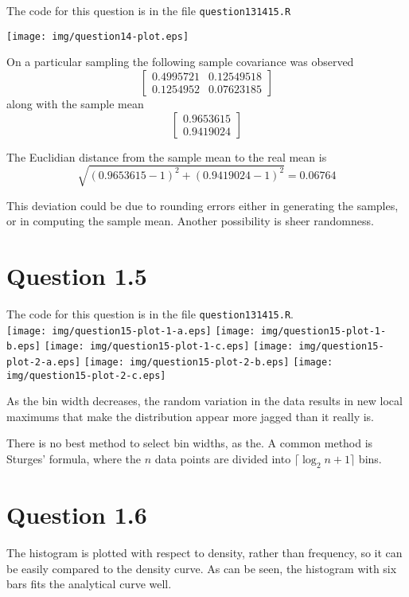 \documentclass[a4paper, oneside, final]{memoir}
\begin{document}
The code for this question is in the file \texttt{question131415.R}

\texttt{[image: img/question14-plot.eps]}

On a particular sampling the following sample covariance was observed
\[
\left[\begin{matrix}0.4995721&0.12549518\\0.1254952&0.07623185\end{matrix}\right]
\]
along with the sample mean
\[
\left[\begin{matrix}0.9653615\\0.9419024\end{matrix}\right]
\]

The Euclidian distance from the sample mean to the real mean is
\[
\sqrt{(0.9653615-1)^2+(0.9419024-1)^2}=0.06764
\]

This deviation could be due to rounding errors either in generating
the samples, or in computing the sample mean.  Another possibility is
sheer randomness.

\section*{Question 1.5}

The code for this question is in the file \texttt{question131415.R}.\\
\texttt{[image: img/question15-plot-1-a.eps]}
\texttt{[image: img/question15-plot-1-b.eps]}
\texttt{[image: img/question15-plot-1-c.eps]}
\texttt{[image: img/question15-plot-2-a.eps]}
\texttt{[image: img/question15-plot-2-b.eps]}
\texttt{[image: img/question15-plot-2-c.eps]}

As the bin width decreases, the random variation in the data results
in new local maximums that make the distribution appear more jagged
than it really is.

There is no best method to select bin widths, as the.  A common
method is Sturges' formula, where the $n$ data points are divided into
$\lceil\log_2n+1 \rceil$ bins.

\section*{Question 1.6}

The histogram is plotted with respect to density, rather than
frequency, so it can be easily compared to the density curve.  As can
be seen, the histogram with six bars fits the analytical curve well.
\end{document}
